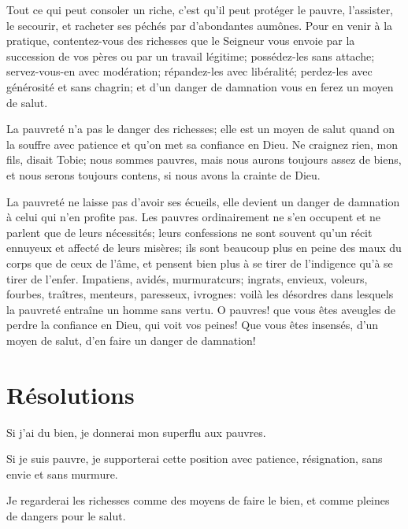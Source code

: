 \documentclass[instructions.tex]{subfiles}
\begin{document}
Tout ce qui peut consoler un riche, c’est qu’il peut protéger le pauvre, l’assister, le secourir, et racheter ses péchés par d’abondantes aumônes. Pour en venir à la pratique, contentez-vous des richesses que le Seigneur vous envoie par la succession de vos pères ou par un travail légitime; possédez-les sans attache; servez-vous-en avec modération; répandez-les avec libéralité; perdez-les avec générosité et sans chagrin; et d’un danger de damnation vous en ferez un moyen de salut.
 
\tertio La pauvreté n’a pas le danger des richesses; elle est un moyen de salut quand on la souffre avec patience et qu’on met sa confiance en Dieu. Ne craignez rien, mon fils, disait Tobie; nous sommes pauvres, mais nous aurons toujours assez de biens, et nous serons toujours contens, si nous avons la crainte de Dieu.
 
La pauvreté ne laisse pas d’avoir ses écueils, elle devient un danger de damnation à celui qui n’en profite pas. Les pauvres ordinairement ne s’en occupent et ne parlent que de leurs nécessités; leurs confessions ne sont souvent qu’un récit ennuyeux et affecté de leurs misères; ils sont beaucoup plus en peine des maux du corps que de ceux de l’âme, et pensent bien plus à se tirer de l’indigence qu’à se tirer de l’enfer. Impatiens, avidés, murmuratcurs; ingrats, envieux, voleurs, fourbes, traîtres, menteurs, paresseux, ivrognes: voilà les désordres dans lesquels la pauvreté entraîne un homme sans vertu. O pauvres! que vous êtes aveugles de perdre la confiance en Dieu, qui voit vos peines! Que vous êtes insensés, d’un moyen de salut, d’en faire un danger de damnation!
 
\section{Résolutions}
 
\primo Si j’ai du bien, je donnerai mon superflu aux pauvres.

\secundo Si je suis pauvre, je supporterai cette position avec patience, résignation, sans envie et sans murmure. 

\tertio Je regarderai les richesses comme des moyens de faire le bien, et comme pleines de dangers pour le salut. 

 
\end{document}
